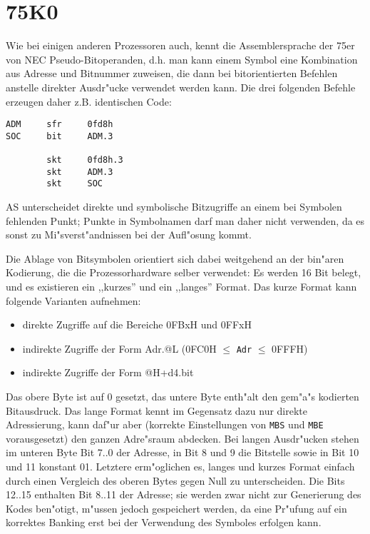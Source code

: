 \documentclass[12pt,a4paper,twoside]{report}
\newcommand{\tty}[1]{{\tt #1}}
\begin{document}
{%

\section{75K0}
\label{75K0Spec}

Wie bei einigen anderen Prozessoren auch, kennt die Assemblersprache
der 75er von NEC Pseudo-Bitoperanden, d.h. man kann einem Symbol
eine Kombination aus Adresse und Bitnummer zuweisen, die dann bei
bitorientierten Befehlen anstelle direkter Ausdr"ucke verwendet werden
kann.  Die drei folgenden Befehle erzeugen daher z.B. identischen
Code:
\begin{verbatim}
ADM     sfr     0fd8h
SOC     bit     ADM.3

        skt     0fd8h.3
        skt     ADM.3
        skt     SOC
\end{verbatim}
AS unterscheidet direkte und symbolische Bitzugriffe an einem
bei Symbolen fehlenden Punkt; Punkte in Symbolnamen darf man daher
nicht verwenden, da es sonst zu Mi"sverst"andnissen bei der Aufl"osung
kommt.
\par
Die Ablage von Bitsymbolen orientiert sich dabei weitgehend an der
bin"aren Kodierung, die die Prozessorhardware selber verwendet:  Es
werden 16 Bit belegt, und es existieren ein ,,kurzes'' und ein ,,langes''
Format.  Das kurze Format kann folgende Varianten aufnehmen:
\begin{itemize}
 \item{direkte Zugriffe auf die Bereiche 0FBxH und 0FFxH}
 \item{indirekte Zugriffe der Form Adr.@L (0FC0H $\leq$ \tty{Adr} $\leq$ 0FFFH)}
 \item{indirekte Zugriffe der Form @H+d4.bit}
\end{itemize}
Das obere Byte ist auf 0 gesetzt, das untere Byte enth"alt den gem"a"s
\cite{NEC75} kodierten Bitausdruck.  Das lange Format kennt im Gegensatz
dazu nur direkte Adressierung, kann daf"ur aber (korrekte Einstellungen
von \tty{MBS} und \tty{MBE} vorausgesetzt) den ganzen Adre"sraum abdecken.
Bei langen Ausdr"ucken stehen im unteren Byte Bit 7..0 der Adresse, in
Bit 8 und 9 die Bitstelle sowie in Bit 10 und 11 konstant 01.  Letztere
erm"oglichen es, langes und kurzes Format einfach durch einen Vergleich
des oberen Bytes gegen Null zu unterscheiden.  Die Bits 12..15 enthalten
Bit 8..11 der Adresse; sie werden zwar nicht zur Generierung des Kodes
ben"otigt, m"ussen jedoch gespeichert werden, da eine Pr"ufung auf ein
korrektes Banking erst bei der Verwendung des Symboles erfolgen kann.

}
\end{document}
